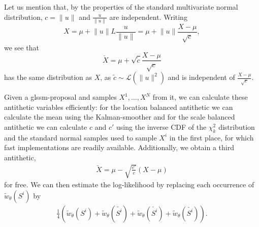 Let us mention that, by the properties of the standard multivariate normal distribution, $ c = \lVert u \rVert $ and $ \frac{u}{ \lVert u \rVert }$ are independent. Writing 
$$
    X = \mu + \lVert u \rVert L \frac{u}{ \lVert u \rVert } = \mu + \lVert u \rVert \frac{X - \mu}{\sqrt{c}},
$$
we see that 
$$
    \check X = \mu + \sqrt{\tilde c}\frac{X - \mu}{\sqrt{c}}
$$
has the same distribution as $X$, as $\tilde c \sim \mathcal L( \lVert u \rVert^{2})$ and is independent of $ \frac{X - \mu}{\sqrt{c}}$. 

Given a \gls{glssm}-proposal and samples $X^{1}, \dots, X^{N}$ from it, we can calculate these antithetic variables efficiently: for the location balanced antithetic we can calculate the mean using the Kalman-smoother and for the scale balanced antithetic we can calculate $c$ and $c'$ using the inverse CDF of the $\chi^{2}_{k}$ distribution and the standard normal samples used to sample $X^{i}$ in the first place, for which fast implementations are readily available. Additionally, we obtain a third antithetic, 
\begin{align}
    \label{eq:antithetic-scale-location}
    \breve{X} = \mu - \sqrt{ \frac{c'}{c}} (X - \mu)
\end{align}
for free. We can then estimate the log-likelihood by replacing each occurrence of $\tilde w_{\theta}(S^{i})$ by 
\begin{align}
    \label{eq:antithetic-weights}
    \frac{1}{4} \left( \tilde w_{\theta} (S^{i}) + \tilde w_{\theta}(\tilde{S^{i}}) + \tilde w_{\theta}(\check{S^{i}}) + \tilde w_{\theta}(\breve{{S^{i}}}) \right).
\end{align}



